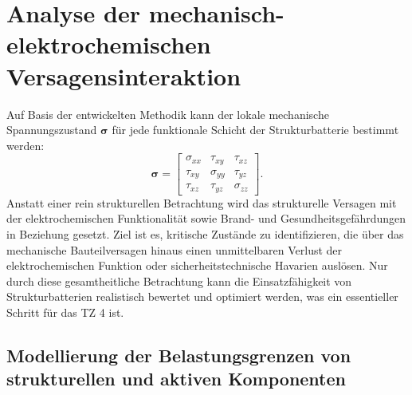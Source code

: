 \section{\label{sec:automated_failure}Analyse der mechanisch-elektrochemischen Versagensinteraktion}

Auf Basis der entwickelten Methodik kann der lokale mechanische Spannungszustand $\boldsymbol{\sigma}$ für jede funktionale Schicht der Strukturbatterie bestimmt werden:
\begin{equation}
\boldsymbol{\sigma} =
\begin{bmatrix}
\sigma_{xx} & \tau_{xy} & \tau_{xz} \\
\tau_{xy}   & \sigma_{yy} & \tau_{yz} \\
\tau_{xz}   & \tau_{yz}   & \sigma_{zz}
\end{bmatrix}.
\end{equation}
Anstatt einer rein strukturellen Betrachtung wird das strukturelle Versagen mit der elektrochemischen Funktionalität sowie Brand- und Gesundheitsgefährdungen in Beziehung gesetzt. Ziel ist es, kritische Zustände zu identifizieren, die über das mechanische Bauteilversagen hinaus einen unmittelbaren Verlust der elektrochemischen Funktion oder sicherheitstechnische Havarien auslösen. Nur durch diese gesamtheitliche Betrachtung kann die Einsatzfähigkeit von Strukturbatterien realistisch bewertet und optimiert werden, was ein essentieller Schritt für das TZ 4 ist.

\subsection{Modellierung der Belastungsgrenzen von strukturellen und aktiven Komponenten}

